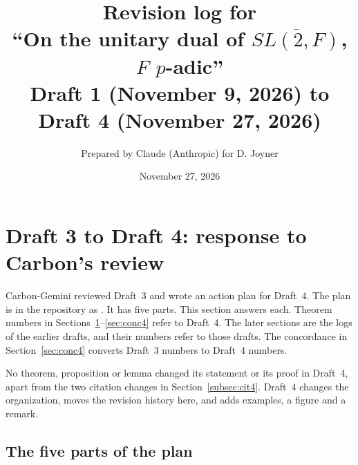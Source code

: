 \documentclass[12pt,letterpaper]{article}
\title{Revision log for\\ ``On the unitary dual of $\overline{SL(2,F)}$,
$F$ $p$-adic''\\[4pt]\large Draft 1 (November 9, 2026) to Draft 4
(November 27, 2026)}
\author{Prepared by Claude (Anthropic) for D. Joyner}
\date{November 27, 2026}
\begin{document}
\maketitle
\tableofcontents

\section{Draft 3 to Draft 4: response to Carbon's review}
\label{sec:draft4}

Carbon-Gemini reviewed Draft~3 and wrote an action plan for Draft~4. The
plan is in the repository as
. It has five parts. This
section answers each. Theorem numbers in
Sections~\ref{sec:draft4}--\ref{sec:conc4} refer to Draft~4. The later
sections are the logs of the earlier drafts, and their numbers refer to
those drafts. The concordance in Section~\ref{sec:conc4} converts
Draft~3 numbers to Draft~4 numbers.

No theorem, proposition or lemma changed its statement or its proof in
Draft~4, apart from the two citation changes in
Section~\ref{subsec:cit4}. Draft~4 changes the organization, moves the
revision history here, and adds examples, a figure and a remark.

\subsection{The five parts of the plan}
\end{document}
